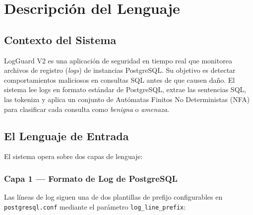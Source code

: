 \documentclass[12pt, a4paper]{report}
\theoremstyle{definition}
\theoremstyle{remark}
\begin{document}
\chapter{Descripción del Lenguaje}

\section{Contexto del Sistema}

LogGuard V2 es una aplicación de seguridad en tiempo real que monitorea archivos
de registro (\emph{logs}) de instancias PostgreSQL. Su objetivo es detectar
comportamientos maliciosos en consultas SQL antes de que causen daño. El sistema
lee logs en formato estándar de PostgreSQL, extrae las sentencias SQL, las
tokeniza y aplica un conjunto de Autómatas Finitos No Deterministas (NFA) para
clasificar cada consulta como \emph{benigna} o \emph{amenaza}.

\section{El Lenguaje de Entrada}

El sistema opera sobre dos capas de lenguaje:

\subsection{Capa 1 — Formato de Log de PostgreSQL}

Las líneas de log siguen una de dos plantillas de prefijo configurables en
\texttt{postgresql.conf} mediante el parámetro \texttt{log\_line\_prefix}:

\begin{center}
\small
{}
\end{center}
\end{document}
